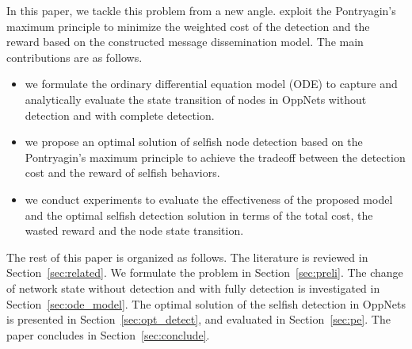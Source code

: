 In this paper, 
we tackle this problem from a new angle.
exploit the Pontryagin's maximum principle to
minimize the weighted cost of the detection and the reward
based on the constructed message dissemination model.
The main contributions are as follows.

\begin{itemize}
\item {we formulate the ordinary differential equation model (ODE)
to capture and analytically evaluate the state transition of nodes
in OppNets without detection and with complete detection.}
\item {we propose an optimal solution of selfish node detection
based on the Pontryagin's maximum principle
to achieve the tradeoff between the detection cost
and the reward of selfish behaviors.}
\item {we conduct experiments to evaluate
the effectiveness of the proposed model
and the optimal selfish detection solution
in terms of the total cost, the wasted reward and the node state transition.}
\end{itemize}

The rest of this paper is organized as follows.
The literature is reviewed in Section~\ref{sec:related}.
We formulate the problem in Section~\ref{sec:preli}.
The change of network state without detection and with fully detection
is investigated in Section~\ref{sec:ode_model}.
The optimal solution of the selfish detection in OppNets
is presented in Section~\ref{sec:opt_detect},
and evaluated in Section~\ref{sec:pe}.
The paper concludes in Section~\ref{sec:conclude}.
